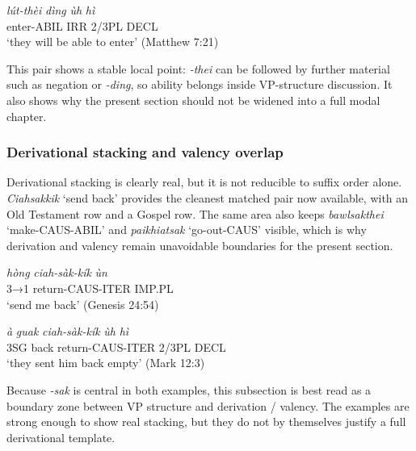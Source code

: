 \documentclass[
  11pt,
  a4paper,
]{article}
\newcommand{\tdim}[1]{\textit{#1}}
\newcommand{\tdimword}[1]{\textit{#1}}
\renewcommand{\textsc}[1]{{\footnotesize\MakeUppercase{#1}}}
\newcommand{\glossquote}[1]{`#1'}
\begin{document}
\begin{exe}
\ex \label{ex:vp-lutthei-ding-matt7}
\gll \tdimword{lút-thèi} \tdimword{dìng} \tdimword{ùh} \tdimword{hì} \\
     enter-\textsc{abil} \textsc{irr} 2/3PL \textsc{decl} \\
\glt \glossquote{they will be able to enter} (Matthew 7:21)
\end{exe}

This pair shows a stable local point: \tdim{-thei} can be followed by
further material such as negation or \tdim{-ding}, so ability belongs
inside VP-structure discussion. It also shows why the present section
should not be widened into a full modal chapter.

\subsubsection{Derivational stacking and valency
overlap}\label{derivational-stacking-and-valency-overlap}

Derivational stacking is clearly real, but it is not reducible to suffix
order alone. \tdim{Ciahsakkik} \glossquote{send back} provides the
cleanest matched pair now available, with an Old Testament row and a
Gospel row. The same area also keeps \tdim{bawlsakthei}
\glossquote{make-CAUS-ABIL} and \tdim{paikhiatsak}
\glossquote{go-out-CAUS} visible, which is why derivation and valency
remain unavoidable boundaries for the present section.

\begin{exe}
\ex \label{ex:vp-ciahsakkik-gen24}
\gll \tdimword{hòng} \tdimword{ciah-sàk-kík} \tdimword{ùn} \\
     \textsc{3→1} return-\textsc{caus}-\textsc{iter} \textsc{imp}.\textsc{pl} \\
\glt \glossquote{send me back} (Genesis 24:54)
\end{exe}

\begin{exe}
\ex \label{ex:vp-ciahsakkik-mark12}
\gll \tdimword{à} \tdimword{guak} \tdimword{ciah-sàk-kík} \tdimword{ùh} \tdimword{hì} \\
     \textsc{3sg} back return-\textsc{caus}-\textsc{iter} 2/3PL \textsc{decl} \\
\glt \glossquote{they sent him back empty} (Mark 12:3)
\end{exe}

Because \tdim{-sak} is central in both examples, this subsection is best
read as a boundary zone between VP structure and derivation / valency.
The examples are strong enough to show real stacking, but they do not by
themselves justify a full derivational template.
\end{document}
